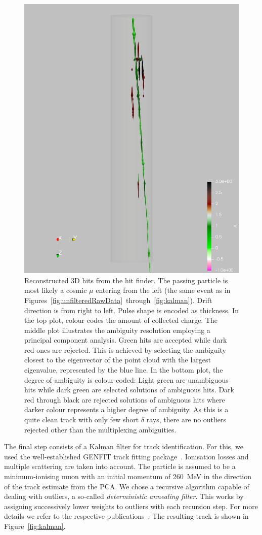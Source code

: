 \documentclass[a4paper]{article}
\begin{document}
\begin{figure}[htb]
	\includegraphics[viewport=600 0 1000 2000, clip, height=\textwidth, angle=90]{event967_pulses_a_det}
	\caption{Reconstructed 3D hits from the hit finder.
		The passing particle is most likely a cosmic $\mu$ entering from the left (the same event as in Figures~\ref{fig:unfilteredRawData}~through~\ref{fig:kalman}).
		Drift direction is from right to left.
		Pulse shape is encoded as thickness.
		In the top plot, colour codes the amount of collected charge.
		The middle plot illustrates the ambiguity resolution employing a principal component analysis.
		Green hits are accepted while dark red ones are rejected.
		This is achieved by selecting the ambiguity closest to the eigenvector of the point cloud with the largest eigenvalue, represented by the blue line.
		In the bottom plot, the degree of ambiguity is colour-coded: Light green are unambiguous hits while dark green are selected solutions of ambiguous hits.
		Dark red through black are rejected solutions of ambiguous hits where darker colour represents a higher degree of ambiguity.
		As this is a quite clean track with only few short $\delta$ rays, there are no outliers rejected other than the multiplexing ambiguities.}
	\label{fig:pca}
\end{figure}

The final step consists of a Kalman filter for track identification.
For this, we used the well-established GENFIT track fitting package~\cite{genfit1, genfit2}.
Ionisation losses and multiple scattering are taken into account.
The particle is assumed to be a minimum-ionising muon with an initial momentum of \SI{260}{\mega\electronvolt} in the direction of the track estimate from the PCA.
We chose a recursive algorithm capable of dealing with outliers, a so-called \emph{deterministic annealing filter}.
This works by assigning successively lower weights to outliers with each recursion step.
For more details we refer to the respective publications~\cite{genfit1, genfit2}.
The resulting track is shown in Figure~\ref{fig:kalman}.
\end{document}
